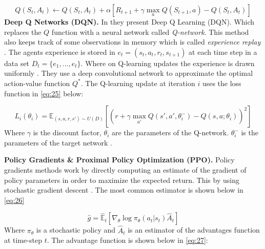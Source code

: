 \documentclass{kththesis}
\theoremstyle{definition}
\begin{document}
\begin{equation}
    \label{eq:24}
     Q(S_t, A_t) \leftarrow Q(S_t, A_t) + \alpha \left[R_{t+1} + \gamma \underset{a}{\operatorname{max}} Q(S_{t+1}, a) - Q(S_t, A_t) \right]
\end{equation}
\newline
\textbf{Deep Q Networks (DQN).} In \textcite{mnih2015human} they present Deep Q Learning (DQN). Which replaces the $Q$ function with a neural network called \textit{Q-network}. This method also keeps track of some observations in memory which is called \textit{experience replay} \parencite{mnih2015human}. The agents experience is stored in $e_t = (s_t, a_t, r_t, s_{t+1})$ at each time step in a data set $D_t = \{e_1, ..., e_t\}$. Where on Q-learning updates the experience is drawn uniformly \parencite{mnih2015human}. They use a deep convolutional network to approximate the optimal action-value function $Q^{*}$. The Q-learning update at iteration $i$ uses the loss function in \autoref{eq:25} below:

\begin{equation}
    \label{eq:25}
    L_i(\theta_i) = \mathbb{E}_{(s,a,r,s') \sim U(D)} \left[\left(r+ \gamma \underset{a'}{\operatorname{max}}Q(s', a', \theta_{i}^{-})-Q(s,a;\theta_i)  \right)^2 \right]
\end{equation}
Where $\gamma$ is the discount factor, $\theta_i$ are the parameters of the Q-network. $\theta_{i}^{-}$ is the parameters of the target network \parencite{mnih2015human}.
\newline

\textbf{Policy Gradients \& Proximal Policy Optimization (PPO).} Policy gradients methods work by directly computing an estimate of the gradient of policy parameters in order to maximize the expected return. This by using stochastic gradient descent \parencite{bansal2017emergent, schulman2017proximal}. The most common estimator is shown below in \autoref{eq:26}

\begin{equation}
    \label{eq:26}
    \hat{g} = \hat{\mathbb{E}}_{t}\left[\nabla_{\theta} \log{\pi_{\theta}(a_t|s_t)\hat{A}_{t}} \right]
\end{equation}
Where $\pi_{\theta}$ is a stochastic policy and $\hat{A}_{t}$ is an estimator of the advantages function at time-step $t$. The advantage function is shown below in \autoref{eq:27}:
\end{document}

